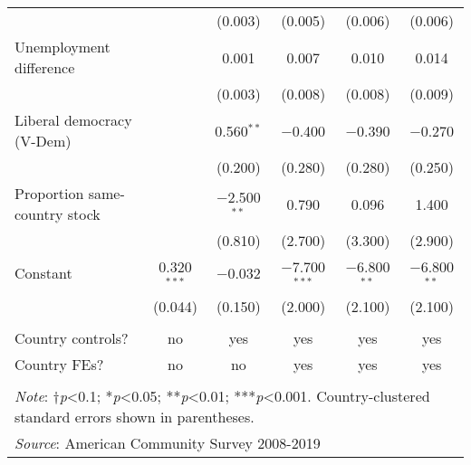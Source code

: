 \documentclass[
  11pt,
]{article}
\begin{document}
\begin{table}[H]
\begin{tabular}{@{\extracolsep{5pt}}lccccc}
  &  & (0.003) & (0.005) & (0.006) & (0.006) \\ 
  Unemployment difference &  & 0.001 & 0.007 & 0.010 & 0.014 \\ 
  &  & (0.003) & (0.008) & (0.008) & (0.009) \\ 
  Liberal democracy (V-Dem) &  & 0.560$^{**}$ & $-$0.400 & $-$0.390 & $-$0.270 \\ 
  &  & (0.200) & (0.280) & (0.280) & (0.250) \\ 
  Proportion same-country stock &  & $-$2.500$^{**}$ & 0.790 & 0.096 & 1.400 \\ 
  &  & (0.810) & (2.700) & (3.300) & (2.900) \\ 
  Constant & 0.320$^{***}$ & $-$0.032 & $-$7.700$^{***}$ & $-$6.800$^{**}$ & $-$6.800$^{**}$ \\ 
  & (0.044) & (0.150) & (2.000) & (2.100) & (2.100) \\ 
 \hline \\[-1.8ex] 
Country controls? & no & yes & yes & yes & yes \\ 
Country FEs? & no & no & yes & yes & yes \\ 
\hline 
\hline \\[-1.8ex] 
\multicolumn{6}{l}{\parbox[t]{.8\textwidth}{\textit{Note}: †\textit{p}<0.1; *\textit{p}<0.05; **\textit{p}<0.01; ***\textit{p}<0.001. Country-clustered standard errors shown in parentheses.}} \\ 
\multicolumn{6}{l}{\textit{Source}: American Community Survey 2008-2019} \\ 
\end{tabular} 
\end{table}
\end{document}
